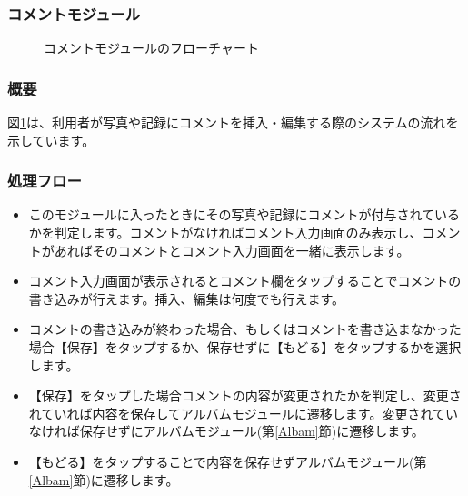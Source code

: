 \documentclass[a4j]{jarticle}
\begin{document}
\subsubsection{コメントモジュール\label{Coment}}
\begin{figure}[H]
    \begin{center}
    \caption {コメントモジュールのフローチャート}
    \label{coment}
    \end{center}
\end{figure}

\subsubsection*{概要}
図\ref{coment}は、利用者が写真や記録にコメントを挿入・編集する際のシステムの流れを示しています。

\subsubsection*{処理フロー}
\begin{itemize}
\item このモジュールに入ったときにその写真や記録にコメントが付与されているかを判定します。コメントがなければコメント入力画面のみ表示し、コメントがあればそのコメントとコメント入力画面を一緒に表示します。
\item コメント入力画面が表示されるとコメント欄をタップすることでコメントの書き込みが行えます。挿入、編集は何度でも行えます。
\item コメントの書き込みが終わった場合、もしくはコメントを書き込まなかった場合【保存】をタップするか、保存せずに【もどる】をタップするかを選択します。
\item 【保存】をタップした場合コメントの内容が変更されたかを判定し、変更されていれば内容を保存してアルバムモジュールに遷移します。変更されていなければ保存せずにアルバムモジュール(第\ref{Albam}節)に遷移します。
\item 【もどる】をタップすることで内容を保存せずアルバムモジュール(第\ref{Albam}節)に遷移します。
\end{itemize}
\newpage
\end{document}
